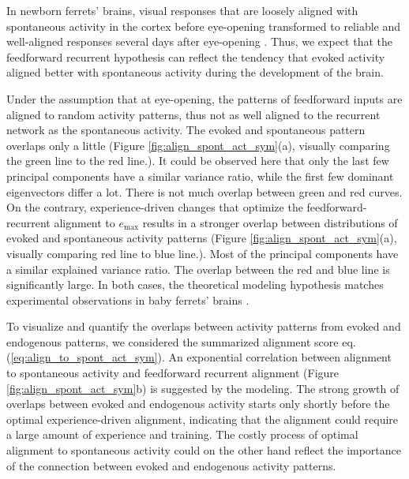 \documentclass[11pt]{article}
\begin{document}
	In newborn ferrets' brains, visual responses that are loosely aligned with spontaneous activity in the cortex before eye-opening transformed to reliable and well-aligned responses several days after eye-opening \cite{tragenap2023nature}. Thus, we expect that the feedforward recurrent hypothesis can reflect the tendency that evoked activity aligned better with spontaneous activity during the development of the brain. 
	
	Under the assumption that at eye-opening, the patterns of feedforward inputs are aligned to random activity patterns, thus not as well aligned to the recurrent network as the spontaneous activity. The evoked and spontaneous pattern overlaps only a little (Figure \ref{fig:align_spont_act_sym}(a), visually comparing the green line to the red line.). It could be observed here that only the last few principal components have a similar variance ratio, while the first few dominant eigenvectors differ a lot. There is not much overlap between green and red curves. On the contrary, experience-driven changes that optimize the feedforward-recurrent alignment to $e_{\text{max}}$ results in a stronger overlap between distributions of evoked and spontaneous activity patterns (Figure \ref{fig:align_spont_act_sym}(a), visually comparing red line to blue line.). Most of the principal components have a similar explained variance ratio. The overlap between the red and blue line is significantly large. In both cases, the theoretical modeling hypothesis matches experimental observations in baby ferrets' brains \cite{tragenap2023nature}.
	
	To visualize and quantify the overlaps between activity patterns from evoked and endogenous patterns, we considered the summarized alignment score eq.(\ref{eq:align_to_spont_act_sym}). An exponential correlation between alignment to spontaneous activity and feedforward recurrent alignment (Figure \ref{fig:align_spont_act_sym}b) is suggested by the modeling. The strong growth of overlaps between evoked and endogenous activity starts only shortly before the optimal experience-driven alignment, indicating that the alignment could require a large amount of experience and training. The costly process of optimal alignment to spontaneous activity could on the other hand reflect the importance of the connection between evoked and endogenous activity patterns. 
\end{document}
